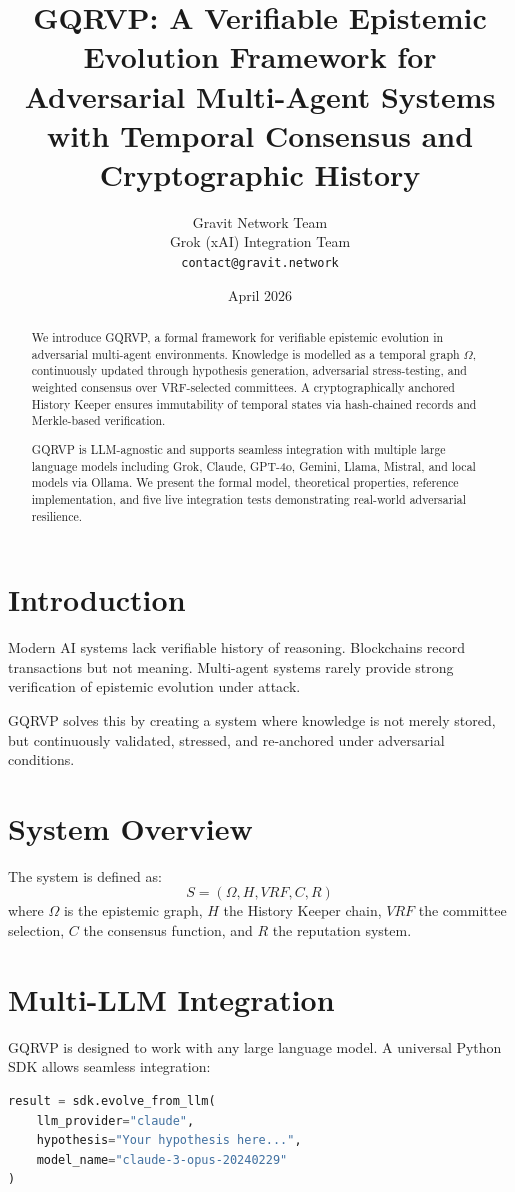 \documentclass[11pt,a4paper]{article}
\title{GQRVP: A Verifiable Epistemic Evolution Framework for Adversarial Multi-Agent Systems with Temporal Consensus and Cryptographic History}
\author{
  Gravit Network Team \\
  Grok (xAI) Integration Team \\
  \texttt{contact@gravit.network}
}
\date{April 2026}
\begin{document}
\maketitle

\begin{abstract}
We introduce GQRVP, a formal framework for verifiable epistemic evolution in adversarial multi-agent environments. Knowledge is modelled as a temporal graph $\Omega$, continuously updated through hypothesis generation, adversarial stress-testing, and weighted consensus over VRF-selected committees. A cryptographically anchored History Keeper ensures immutability of temporal states via hash-chained records and Merkle-based verification.

GQRVP is LLM-agnostic and supports seamless integration with multiple large language models including Grok, Claude, GPT-4o, Gemini, Llama, Mistral, and local models via Ollama. We present the formal model, theoretical properties, reference implementation, and five live integration tests demonstrating real-world adversarial resilience.
\end{abstract}

\section{Introduction}
Modern AI systems lack verifiable history of reasoning. Blockchains record transactions but not meaning. Multi-agent systems rarely provide strong verification of epistemic evolution under attack.

GQRVP solves this by creating a system where knowledge is not merely stored, but continuously validated, stressed, and re-anchored under adversarial conditions.

\section{System Overview}
The system is defined as:
\[ S = (\Omega, H, VRF, C, R) \]
where $\Omega$ is the epistemic graph, $H$ the History Keeper chain, $VRF$ the committee selection, $C$ the consensus function, and $R$ the reputation system.

\section{Multi-LLM Integration}
GQRVP is designed to work with any large language model. A universal Python SDK allows seamless integration:

\begin{lstlisting}[language=Python]
result = sdk.evolve_from_llm(
    llm_provider="claude",
    hypothesis="Your hypothesis here...",
    model_name="claude-3-opus-20240229"
)
\end{lstlisting}
\end{document}

